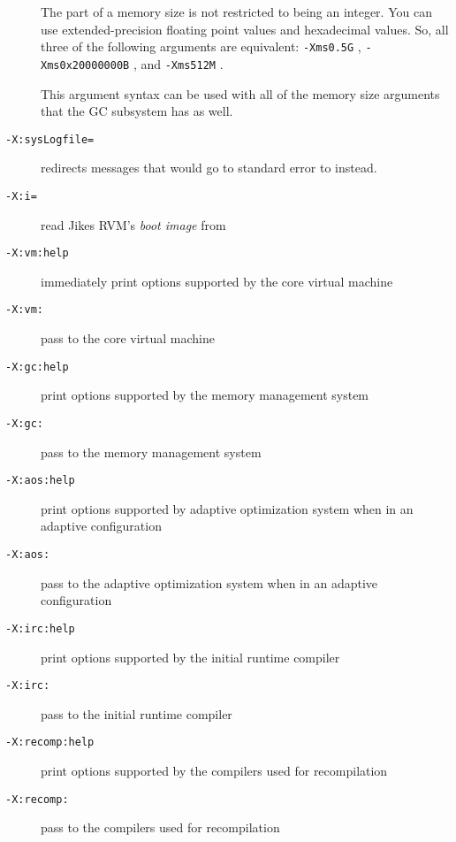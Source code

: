 \begin{description}
{The  part of a memory size is not restricted to being an
integer.  You can use extended-precision floating point values and
hexadecimal values.  So, all three of the following arguments are
equivalent:
\texttt{-Xms0.5G} , \texttt{-Xms0x20000000B} , and \texttt{-Xms512M} .

This argument syntax can be used with all of the memory size
arguments that the GC subsystem has as well.
}

\item[{\tt -X:sysLogfile=\Mmeta{filename}}]
redirects messages that would go to standard error to  instead.

\item[{\tt -X:i=\Mmeta{filename}}]
read Jikes RVM's \emph{boot image} from 

\item[{\tt -X:vm\Mlsq{}:help\Mrsq{}}]
immediately print options supported by the core virtual machine

\item[{\tt -X:vm:\Mmeta{option}}]
pass  to the core virtual machine

\item[{\tt -X:gc\Mlsq{}:help\Mrsq}]
print options supported by the memory management system

\item[{\tt -X:gc:\Mmeta{option}}]
pass  to the memory management system

\item[{\tt -X:aos\Mlsq{}:help\Mrsq{}}]
print options supported by adaptive optimization system when in an
adaptive configuration

\item[{\tt -X:aos:\Mmeta{option}}]
pass  to the adaptive optimization system when in an adaptive configuration

\item[{\tt -X:irc\Mlsq{}:help\Mrsq{}}]
print options supported by the initial runtime compiler

\item[{\tt -X:irc:\Mmeta{option}}]
pass  to the initial runtime compiler

\item[{\tt -X:recomp\Mlsq{}:help\Mrsq{}}]
print options supported by the compilers used for recompilation

\item[{\tt -X:recomp:\Mmeta{option}}]
pass  to the compilers used for recompilation


\end{description}
